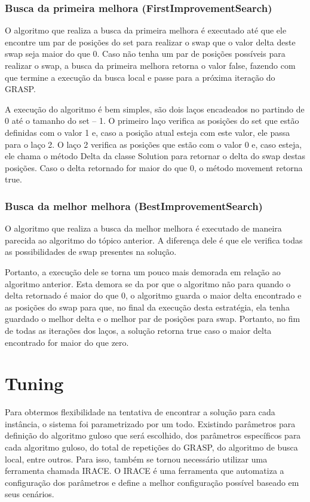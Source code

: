 \documentclass[12pt]{article}
\begin{document}
\subsubsection{Busca da primeira melhora (FirstImprovementSearch)}\label{fis}
O algoritmo que realiza a busca da primeira melhora é executado até que ele encontre um par de posições do set para realizar o swap que o valor delta deste swap seja maior do que 0. Caso não tenha um par de posições possíveis para realizar o swap, a busca da primeira melhora retorna o valor false, fazendo com que termine a execução da busca local e passe para a próxima iteração do GRASP.

A execução do algoritmo é bem simples, são dois laços encadeados no partindo de 0 até o tamanho do set – 1. O primeiro laço verifica as posições do set que estão definidas com o valor 1 e, caso a posição atual esteja com este valor, ele passa para o laço 2. O laço 2 verifica as posições que estão com o valor 0 e, caso esteja, ele chama o método Delta da classe Solution para retornar o delta do swap destas posições. Caso o delta retornado for maior do que 0, o método movement retorna true.

\subsubsection{Busca da melhor melhora (BestImprovementSearch)}\label{bis}
O algoritmo que realiza a busca da melhor melhora é executado de maneira parecida ao algoritmo do tópico anterior. A diferença dele é que ele verifica todas as possibilidades de swap presentes na solução. 

Portanto, a execução dele se torna um pouco mais demorada em relação ao algoritmo anterior. Esta demora se da por que o algoritmo não para quando o delta retornado é maior do que 0, o algoritmo guarda o maior delta encontrado e as posições do swap para que, no final da execução desta estratégia, ela tenha guardado o melhor delta e o melhor par de posições para swap. Portanto, no fim de todas as iterações dos laços, a solução retorna true caso o maior delta encontrado for maior do que zero.

\section{Tuning}
Para obtermos flexibilidade na tentativa de encontrar a solução para cada instância, o sistema foi parametrizado por um todo. Existindo parâmetros para definição do algoritmo guloso que será escolhido, dos parâmetros específicos para cada algoritmo guloso, do total de repetições do GRASP, do algoritmo de busca local, entre outros.
Para isso, também se tornou necessário utilizar uma ferramenta chamada IRACE. O IRACE é uma ferramenta que automatiza a configuração dos parâmetros e define a melhor configuração possível baseado em seus cenários.
\end{document}
